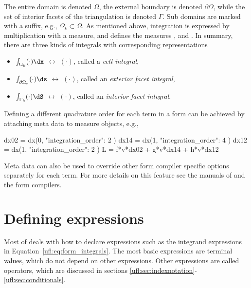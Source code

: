 The entire domain is denoted $\Omega$, the external boundary is
denoted $\partial\Omega$, while the set of interior facets of the
triangulation is denoted $\Gamma$. Sub domains are marked with a
suffix, e.g., $\Omega_k \subset \Omega$. As mentioned above,
integration is expressed by multiplication with a measure, and \ufl{}
defines the measures ,  and .  In
summary, there are three kinds of integrals with corresponding \ufl{}
representations
\begin{itemize}
\item $\int_{        \Omega_k} (\cdot) \dx$ $\leftrightarrow$  $(\cdot)$, called a \emph{cell integral},
\item $\int_{\partial\Omega_k} (\cdot) \ds$ $\leftrightarrow$  $(\cdot)$, called an \emph{exterior facet integral},
\item $\int_{        \Gamma_k} (\cdot) \dS$ $\leftrightarrow$  $(\cdot)$, called an \emph{interior facet integral},
\end{itemize}
Defining a different quadrature order for
each term in a form can be achieved by attaching
meta data to measure objects, e.g.,
\begin{code}
dx02 = dx(0, { "integration_order": 2 })
dx14 = dx(1, { "integration_order": 4 })
dx12 = dx(1, { "integration_order": 2 })
L = f*v*dx02 + g*v*dx14 + h*v*dx12
\end{code}
Meta data can also be used to override other form compiler specific
options separately for each term. For more details on
this feature see the manuals of \ufl{} and the form compilers.


\section{Defining expressions}
\label{ufl:sec:defexpr}

Most of \ufl{} deals with how to declare expressions such as the
integrand expressions in Equation~\ref{ufl:eq:form_integrals}.  The
most basic expressions are terminal values, which do not depend on
other expressions.  Other expressions are called operators, which are
discussed in sections
\ref{ufl:sec:indexnotation}-\ref{ufl:sec:conditionals}.

